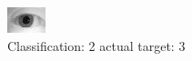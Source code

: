 \begin{figure}[h!]
\begin{center}
\includegraphics[width=0.60\columnwidth]{figures/ID1036_class_2_target_3.png}
\end{center}
\caption{ Classification: 2 actual target: 3}
\label{fig:ID1036_class_2_target_3}
\end{figure}
